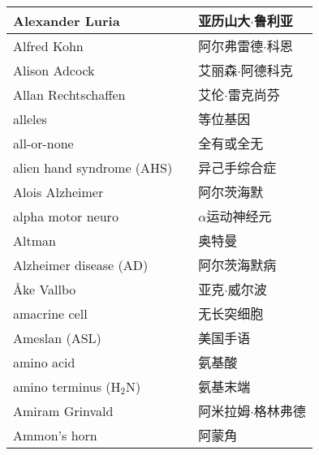 \begin{longtable}{lll}
	\midrule
	Alexander Luria     &&  亚历山大$\cdot$鲁利亚  \\
	
	\midrule
	Alfred Kohn     &&  阿尔弗雷德$\cdot$科恩  \\
	
	\midrule
	Alison Adcock     &&  艾丽森$\cdot$阿德科克  \\
	
	\midrule
	Allan Rechtschaffen     &&  艾伦$\cdot$雷克尚芬  \\
	
	\midrule
	alleles     &&  等位基因  \\
	
	\midrule
	all-or-none     &&  全有或全无  \\
	
	\midrule
	alien hand syndrome (AHS)     &&  异己手综合症  \\
	
	\midrule
	Alois Alzheimer     &&  阿尔茨海默  \\
	
	\midrule
	alpha motor neuro     &&  $\alpha$运动神经元  \\
	
	\midrule
	Altman     &&  奥特曼  \\
	
	\midrule
	Alzheimer disease (AD)     &&  阿尔茨海默病  \\
	
	\midrule
	Åke Vallbo     &&  亚克$\cdot$威尔波  \\
	
	\midrule
	amacrine cell     && 无长突细胞   \\
	
	\midrule
	Ameslan (ASL)    && 美国手语   \\
	
	\midrule
	amino acid   && 氨基酸   \\
	
	\midrule
	amino terminus (H$_2$N)   && 氨基末端   \\
	
	\midrule
	Amiram Grinvald    && 阿米拉姆$\cdot$格林弗德   \\
	
	\midrule
	Ammon's horn    && 阿蒙角   \\
	

\end{longtable}
